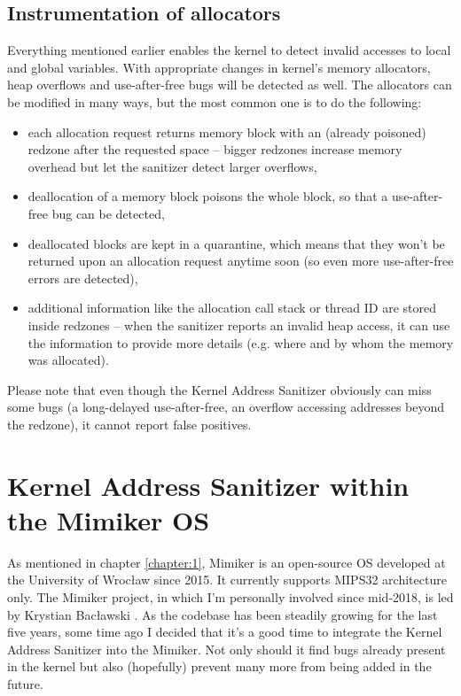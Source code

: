 \documentclass[shortabstract, manyadvisors, english, mgr]{iithesis}
\theoremstyle{definition} \newtheorem*{definition}{Definicja}
\theoremstyle{definition} \newtheorem*{example}{Przykład}
\theoremstyle{definition} \newtheorem*{remark}{Uwaga}
\begin{document}
\section{Instrumentation of allocators}
\label{lbl:instrumentation-allocators}
Everything mentioned earlier enables the kernel to detect invalid accesses to local and global variables. With appropriate changes in kernel's memory allocators, heap overflows and use-after-free bugs will be detected as well. The allocators can be modified in many ways, but the most common one is to do the following:
\begin{itemize}
    \item each allocation request returns memory block with an (already poisoned) redzone after the requested space -- bigger redzones increase memory overhead but let the sanitizer detect larger overflows,
    \item deallocation of a memory block poisons the whole block, so that a use-after-free bug can be detected,
    \item deallocated blocks are kept in a quarantine, which means that they won't be returned upon an allocation request anytime soon (so even more use-after-free errors are detected),
    \item additional information like the allocation call stack or thread ID are stored inside redzones -- when the sanitizer reports an invalid heap access, it can use the information to provide more details (e.g. where and by whom the memory was allocated).
\end{itemize}

Please note that even though the Kernel Address Sanitizer obviously can miss some bugs (a long-delayed use-after-free, an overflow accessing addresses beyond the redzone), it cannot report false positives.

\chapter{Kernel Address Sanitizer within the Mimiker OS}
\label{chapter:5}

As mentioned in chapter \ref{chapter:1}, Mimiker is an open-source OS developed at the University of Wrocław since 2015.
It currently supports MIPS32 architecture only.
The Mimiker project, in which I'm personally involved since mid-2018, is led by Krystian Bacławski \cite{bib:cahir}.
As the codebase has been steadily growing for the last five years, some time ago I decided that it's a good time to integrate the Kernel Address Sanitizer into the Mimiker. Not only should it find bugs already present in the kernel but also (hopefully) prevent many more from being added in the future.
\end{document}
